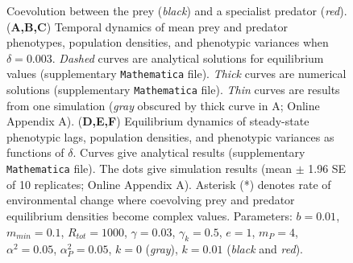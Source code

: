 \documentclass[11pt]{article}
\begin{document}
\begin{figure}[!h]
\centering
\caption{
Coevolution between the prey (\textit{black}) and a specialist predator (\textit{red}).
(\textbf{A,B,C}) Temporal dynamics of mean prey and predator phenotypes, population densities, and phenotypic variances when $\delta = 0.003$.
\textit{Dashed} curves are analytical solutions for equilibrium values (supplementary \texttt{Mathematica} file). 
\textit{Thick} curves are numerical solutions (supplementary \texttt{Mathematica} file). 
\textit{Thin} curves are results from one simulation (\textit{gray} obscured by thick curve in A; Online Appendix A). 
(\textbf{D,E,F}) Equilibrium dynamics of steady-state phenotypic lags, population densities, and phenotypic variances as functions of $\delta$.
Curves give analytical results (supplementary \texttt{Mathematica} file).  
The dots give simulation results (mean $\pm$ 1.96 SE of 10 replicates; Online Appendix A).
Asterisk (*) denotes rate of environmental change where coevolving prey and predator equilibrium densities become complex values.
Parameters: $b=0.01$, $m_{min}=0.1$, $R_{tot}=1000$, $\gamma=0.03$, $\gamma_k=0.5$, $e=1$, $m_P=4$, $\alpha^2=0.05$, $\alpha_P^2=0.05$, $k = 0$ (\textit{gray}), $k=0.01$ (\textit{black} and \textit{red}).
}
\label{Specialist}
\end{figure}
\end{document}
